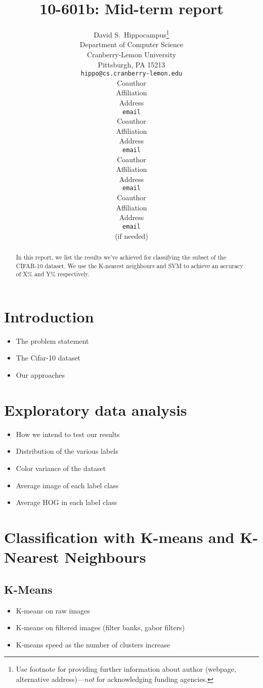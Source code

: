 \documentclass{article} %
\title{10-601b: Mid-term report}
\author{
David S.~Hippocampus\thanks{ Use footnote for providing further information
about author (webpage, alternative address)---\emph{not} for acknowledging
funding agencies.} \\
Department of Computer Science\\
Cranberry-Lemon University\\
Pittsburgh, PA 15213 \\
\texttt{hippo@cs.cranberry-lemon.edu} \\
\And
Coauthor \\
Affiliation \\
Address \\
\texttt{email} \\
\AND
Coauthor \\
Affiliation \\
Address \\
\texttt{email} \\
\And
Coauthor \\
Affiliation \\
Address \\
\texttt{email} \\
\And
Coauthor \\
Affiliation \\
Address \\
\texttt{email} \\
(if needed)\\
}
\begin{document}
\maketitle

\begin{abstract}
    In this report, we list the results we've achieved for classifying the subset of the CIFAR-10 dataset. We use the K-nearest neighbours and SVM to achieve an accuracy of X\% and Y\% respectively.\\
\end{abstract}

\section{Introduction}
    \begin{itemize}
        \item The problem statement
        \item The Cifar-10 dataset
        \item Our approaches
    \end{itemize}

\section{Exploratory data analysis}
    \begin{itemize}
        \item How we intend to test our results
        \item Distribution of the various labels
        \item Color variance of the dataset
        \item Average image of each label class
        \item Average HOG in each label class
    \end{itemize}

\section{Classification with K-means and K-Nearest Neighbours}
    \subsection{K-Means} %
    \label{ssub:K-Means}
        \begin{itemize}
            \item K-means on raw images
            \item K-means on filtered images (filter banks, gabor filters)
            \item K-means speed as the number of clusters increase
        \end{itemize}
\end{document}
